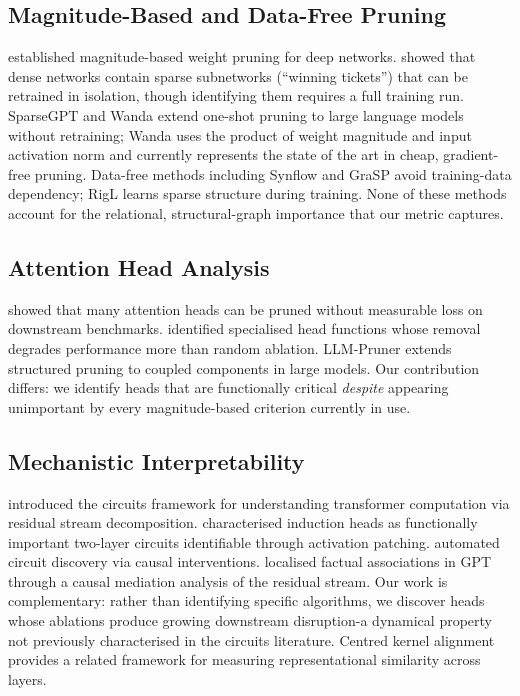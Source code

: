 \documentclass[11pt,a4paper]{article}
\theoremstyle{definition}
\theoremstyle{plain}
\begin{document}
\subsection{Magnitude-Based and Data-Free Pruning}

\citet{han2015learning} established magnitude-based weight pruning for deep
networks.
\citet{frankle2019lottery} showed that dense networks contain sparse
subnetworks (``winning tickets'') that can be retrained in isolation, though
identifying them requires a full training run.
SparseGPT \citep{frantar2023sparsegpt} and Wanda \citep{sun2024wanda}
extend one-shot pruning to large language models without retraining; Wanda
uses the product of weight magnitude and input activation norm and
currently represents the state of the art in cheap, gradient-free pruning.
Data-free methods including Synflow \citep{tanaka2020synflow} and GraSP
\citep{wang2020grasp} avoid training-data dependency; RigL
\citep{evci2020rigging} learns sparse structure during training.
None of these methods account for the relational, structural-graph
importance that our metric captures.

\subsection{Attention Head Analysis}

\citet{michel2019sixteen} showed that many attention heads can be pruned
without measurable loss on downstream benchmarks.
\citet{voita2019analyzing} identified specialised head functions whose
removal degrades performance more than random ablation.
LLM-Pruner \citep{ma2023llmpruner} extends structured pruning to
coupled components in large models.
Our contribution differs: we identify heads that are functionally critical
\emph{despite} appearing unimportant by every magnitude-based criterion
currently in use.

\subsection{Mechanistic Interpretability}

\citet{elhage2021mathematical} introduced the circuits framework for
understanding transformer computation via residual stream decomposition.
\citet{olsson2022induction} characterised induction heads as functionally
important two-layer circuits identifiable through activation patching.
\citet{conmy2023acdc} automated circuit discovery via causal interventions.
\citet{meng2022rome} localised factual associations in GPT through a
causal mediation analysis of the residual stream.
Our work is complementary: rather than identifying specific algorithms, we
discover heads whose ablations produce growing downstream disruption-a
dynamical property not previously characterised in the circuits literature.
Centred kernel alignment \citep{kornblith2019cka} provides a related
framework for measuring representational similarity across layers.
\end{document}
